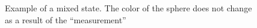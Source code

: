 \begin{figure}
\centering



\caption{Example of a mixed state. The color of the sphere does not change as a result of the ``measurement''}
\label{figAddMixStateExample}
\end{figure}